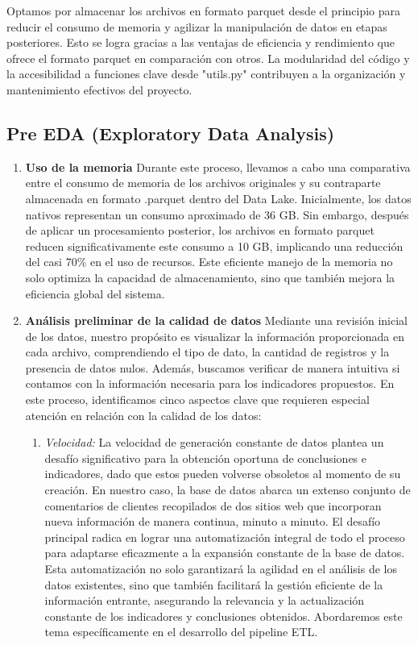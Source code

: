 \documentclass[12pt]{article}
\begin{document}
Optamos por almacenar los archivos en formato parquet desde el principio para reducir el consumo de memoria y agilizar la manipulación de datos en etapas posteriores. Esto se logra gracias a las ventajas de eficiencia y rendimiento que ofrece el formato parquet en comparación con otros. La modularidad del código y la accesibilidad a funciones clave desde "utils.py" contribuyen a la organización y mantenimiento efectivos del proyecto.

\subsection{Pre EDA (Exploratory Data Analysis)}
\begin{enumerate}
    \item \textbf{Uso de la memoria}
    Durante este proceso, llevamos a cabo una comparativa entre el consumo de memoria de los archivos originales y su contraparte almacenada en formato .parquet dentro del Data Lake. Inicialmente, los datos nativos representan un consumo aproximado de 36 GB. Sin embargo, después de aplicar un procesamiento posterior, los archivos en formato parquet reducen significativamente este consumo a 10 GB, implicando una reducción del casi 70\% en el uso de recursos. Este eficiente manejo de la memoria no solo optimiza la capacidad de almacenamiento, sino que también mejora la eficiencia global del sistema.

    \item \textbf{Análisis preliminar de la calidad de datos}
    Mediante una revisión inicial de los datos, nuestro propósito es visualizar la información proporcionada en cada archivo, comprendiendo el tipo de dato, la cantidad de registros y la presencia de datos nulos. Además, buscamos verificar de manera intuitiva si contamos con la información necesaria para los indicadores propuestos. En este proceso, identificamos cinco aspectos clave que requieren especial atención en relación con la calidad de los datos:

    \begin{enumerate}
        \item \textit{Velocidad:} La velocidad de generación constante de datos plantea un desafío significativo para la obtención oportuna de conclusiones e indicadores, dado que estos pueden volverse obsoletos al momento de su creación. En nuestro caso, la base de datos abarca un extenso conjunto de comentarios de clientes recopilados de dos sitios web que incorporan nueva información de manera continua, minuto a minuto. El desafío principal radica en lograr una automatización integral de todo el proceso para adaptarse eficazmente a la expansión constante de la base de datos. Esta automatización no solo garantizará la agilidad en el análisis de los datos existentes, sino que también facilitará la gestión eficiente de la información entrante, asegurando la relevancia y la actualización constante de los indicadores y conclusiones obtenidos. Abordaremos este tema específicamente en el desarrollo del pipeline ETL.


\end{enumerate}
\end{enumerate}
\end{document}
